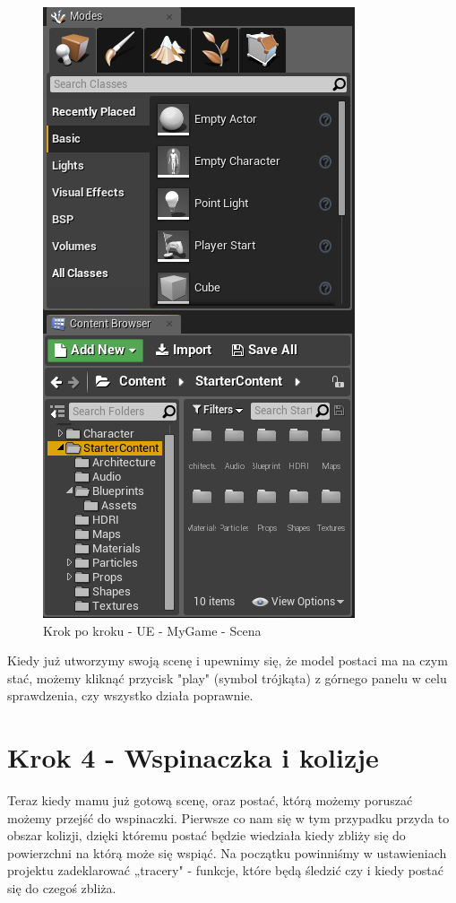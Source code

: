 \documentclass[openright]{xmgr}
\begin{document}
\newpage
\begin{figure}[!htb]
    \begin{center}
    \includegraphics[scale=0.5]{Screeny/UeKrokPoKroku/UE-MyGame-Scene.png}
    \end{center}
    \caption{Krok po kroku - UE -  MyGame - Scena}
\end{figure}

Kiedy już utworzymy swoją scenę i upewnimy się, że model postaci ma na czym stać, możemy kliknąć przycisk "play" (symbol trójkąta) z górnego panelu w celu sprawdzenia, czy wszystko działa poprawnie.

\newpage
\section{Krok 4 - Wspinaczka i kolizje}

Teraz kiedy mamu już gotową scenę, oraz postać, którą możemy poruszać możemy przejść do wspinaczki. Pierwsze co nam się w tym przypadku przyda to obszar kolizji, dzięki któremu postać będzie wiedziała kiedy zbliży się do powierzchni na którą może się wspiąć. Na początku powinniśmy w ustawieniach projektu zadeklarować „tracery" - funkcje, które będą śledzić czy i kiedy postać się do czegoś zbliża.
\end{document}
